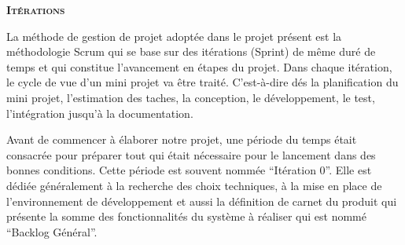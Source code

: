 \thispagestyle{plain}
\begin{center}
\vspace*{7cm}
\textbf{\scshape\Huge Itérations}
\end{center}
{}
\vspace{2cm}

La méthode de gestion de projet adoptée dans le projet présent est la
méthodologie Scrum qui se base sur des itérations (Sprint) de même duré de
temps et qui constitue l'avancement en étapes du projet. Dans chaque itération,
le cycle de vue d'un mini projet va être traité. C'est-à-dire dés la
planification du mini projet, l'estimation des taches, la conception, le
développement, le test, l'intégration jusqu'à la documentation.

Avant de commencer à élaborer notre projet, une période du temps était
consacrée pour préparer tout qui était nécessaire pour le lancement dans des
bonnes conditions. Cette période est souvent nommée ``Itération 0''. Elle est
dédiée généralement à la recherche des choix techniques, à la mise en place de
l'environnement de développement et aussi la définition de carnet du produit
qui présente la somme des fonctionnalités du système à réaliser qui est nommé
``Backlog Général''.

